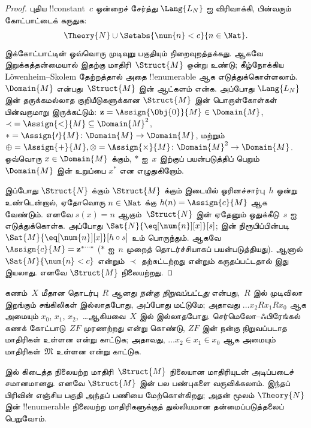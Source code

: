 \documentclass[../../../include/open-logic-section]{subfiles}
\begin{document}
\begin{proof}
புதிய !!{constant}~$c$ ஒன்றைச் சேர்த்து $\Lang{L_N}$ ஐ விரிவாக்கி,
பின்வரும் கோட்பாட்டைக் கருதுக:
\[
\Theory{N} \cup \Setabs{\num{n} < c}{n \in \Nat}.
\]
இக்கோட்பாட்டின் ஒவ்வொரு முடிவுறு பகுதியும் நிறைவுறத்தக்கது.
ஆகவே இறுக்கத்தன்மையால் இதற்கு மாதிரி~$\Struct{M}$ ஒன்று உண்டு;
கீழ்நோக்கிய L\"owenheim--Skolem தேற்றத்தால் அதை
!!{enumerable} ஆக எடுத்துக்கொள்ளலாம்.
$\Domain{M}$ என்பது~$\Struct{M}$ இன் ஆட்களம் என்க. அப்போது
$\Lang{L_N}$ இன் தருக்கமல்லாத குறியீடுகளுக்கான
$\Struct{M}$ இன் பொருள்கோள்கள் பின்வருமாறு இருக்கட்டும்:
$\mathbf{z} = \Assign{\Obj{0}}{M} \in \Domain{M}$,
${\prec} =
\Assign{<}{M} \subseteq \Domain{M}^2$,
$* = \Assign{\prime}{M} \colon
\Domain{M} \to \Domain{M}$, மற்றும்
$\oplus = \Assign{+}{M}, \otimes =
\Assign{\times}{M} \colon \Domain{M}^2 \to \Domain{M}$.
ஒவ்வொரு $x \in \Domain{M}$ க்கும், $*$ ஐ~$x$ இற்குப்
பயன்படுத்திப் பெறும் $\Domain{M}$ இன் உறுப்பை $x^*$ என எழுதுகிறோம்.

இப்போது $\Struct{N}$ க்கும் $\Struct{M}$ க்கும் இடையில்
ஓரினச்சார்பு~$h$ ஒன்று உண்டென்றால், ஏதோவொரு
$n \in \Nat$ க்கு $h(n) = \Assign{c}{M}$ ஆக வேண்டும்.
எனவே $s(x) = n$ ஆகும்~$\Struct{N}$ இன் ஏதேனும் ஒதுக்கீடு~$s$
ஐ எடுத்துக்கொள்க. அப்போது
$\Sat{N}{\eq[\num{n}][x]}[s]$;  இன்
நிரூபிப்பின்படி
$\Sat{M}{\eq[\num{n}][x]}[h \circ s]$ உம் பொருந்தும்.
ஆகவே $\Assign{c}{M} =
\mathbf{z}^{*\cdots *}$ ($*$ ஐ~$n$ முறைத் தொடர்ச்சியாகப்
பயன்படுத்தியது). ஆனால்
$\Sat{M}{\num{n} < c}$ என்றும் $\prec$ தற்சுட்டற்றது
என்றும் கருதப்பட்டதால் இது இயலாது. எனவே $\Struct{M}$
நிலையற்றது.
\end{proof}

\begin{prob}
கணம்~$X$ மீதான தொடர்பு~$R$ ஆனது \emph{நன்கு நிறுவப்பட்டது}
என்பது,~$R$ இல் முடிவிலா இறங்கும் சங்கிலிகள் இல்லாதபோது,
அப்போது மட்டுமே; அதாவது
$\dots x_2Rx_1Rx_0$ ஆக அமையும்
$x_0$, $x_1$, $x_2$,~\dots ஆகியவை~$X$ இல் இல்லாதபோது.
செர்மெலோ--ஃபிரேங்கல் கணக் கோட்பாடு~$ZF$ முரணற்றது
என்று கொண்டு, $ZF$ இன் நன்கு நிறுவப்படாத மாதிரிகள்
உள்ளன என்று காட்டுக; அதாவது,
$\dots x_2 \in x_1 \in x_0$ ஆக அமையும்
மாதிரிகள்~$\mathfrak{M}$ உள்ளன என்று காட்டுக.
\end{prob}

 இல் கிடைத்த நிலையற்ற மாதிரி~$\Struct{M}$
நிலையான மாதிரியுடன் அடிப்படைச் சமானமானது. எனவே
$\Struct{M}$ இன் பல பண்புகளை வருவிக்கலாம்.
இந்தப் பிரிவின் எஞ்சிய பகுதி அந்தப் பணியை மேற்கொள்கிறது;
அதன் மூலம் $\Theory{N}$ இன் !!{enumerable} நிலையற்ற
மாதிரிகளுக்குத் துல்லியமான தன்மைப்படுத்தலைப் பெறுவோம்.
\end{document}
